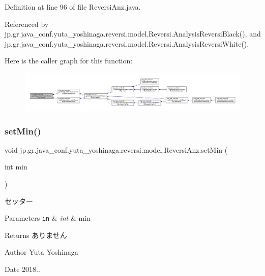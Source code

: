 Definition at line 96 of file Reversi\+Anz.\+java.



Referenced by jp.\+gr.\+java\+\_\+conf.\+yuta\+\_\+yoshinaga.\+reversi.\+model.\+Reversi.\+Analysis\+Reversi\+Black(), and jp.\+gr.\+java\+\_\+conf.\+yuta\+\_\+yoshinaga.\+reversi.\+model.\+Reversi.\+Analysis\+Reversi\+White().

Here is the caller graph for this function\+:
\nopagebreak
\begin{figure}[H]
\begin{center}
\leavevmode
\includegraphics[width=350pt]{classjp_1_1gr_1_1java__conf_1_1yuta__yoshinaga_1_1reversi_1_1model_1_1_reversi_anz_a6afdf8999ea1596591c329c1bf089059_icgraph}
\end{center}
\end{figure}
\mbox{\label{classjp_1_1gr_1_1java__conf_1_1yuta__yoshinaga_1_1reversi_1_1model_1_1_reversi_anz_a01e99c7c05a6cca350ea00cc3a0940bf}} 
\subsubsection{\texorpdfstring{set\+Min()}{setMin()}}
{\footnotesize\ttfamily void jp.\+gr.\+java\+\_\+conf.\+yuta\+\_\+yoshinaga.\+reversi.\+model.\+Reversi\+Anz.\+set\+Min (\begin{DoxyParamCaption}\item[{int}]{min }\end{DoxyParamCaption})}



セッター 


\begin{DoxyParams}[1]{Parameters}
\mbox{\tt in}  & {\em int} & min \\
\hline
\end{DoxyParams}
\begin{DoxyReturn}{Returns}
ありません 
\end{DoxyReturn}
\begin{DoxyAuthor}{Author}
Yuta Yoshinaga 
\end{DoxyAuthor}
\begin{DoxyDate}{Date}
2018.. 
\end{DoxyDate}


